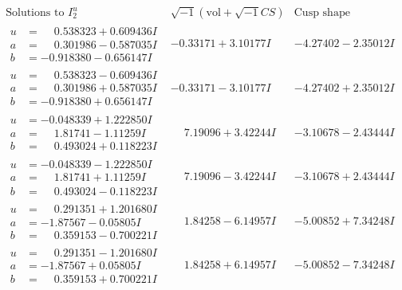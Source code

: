 \documentclass[1p]{elsarticle_modified}
\theoremstyle{definition}
\newcommand{\I}{\sqrt{-1}}
\begin{document}
$$\begin{array}{c|c|c}  
\text{Solutions to }I^u_{2}& \I (\text{vol} + \sqrt{-1}CS) & \text{Cusp shape}\\
 \hline 
\begin{aligned}
u &= \phantom{-}0.538323 + 0.609436 I \\
a &= \phantom{-}0.301986 - 0.587035 I \\
b &= -0.918380 - 0.656147 I\end{aligned}
 & -0.33171 + 3.10177 I & -4.27402 - 2.35012 I \\ \hline\begin{aligned}
u &= \phantom{-}0.538323 - 0.609436 I \\
a &= \phantom{-}0.301986 + 0.587035 I \\
b &= -0.918380 + 0.656147 I\end{aligned}
 & -0.33171 - 3.10177 I & -4.27402 + 2.35012 I \\ \hline\begin{aligned}
u &= -0.048339 + 1.222850 I \\
a &= \phantom{-}1.81741 - 1.11259 I \\
b &= \phantom{-}0.493024 + 0.118223 I\end{aligned}
 & \phantom{-}7.19096 + 3.42244 I & -3.10678 - 2.43444 I \\ \hline\begin{aligned}
u &= -0.048339 - 1.222850 I \\
a &= \phantom{-}1.81741 + 1.11259 I \\
b &= \phantom{-}0.493024 - 0.118223 I\end{aligned}
 & \phantom{-}7.19096 - 3.42244 I & -3.10678 + 2.43444 I \\ \hline\begin{aligned}
u &= \phantom{-}0.291351 + 1.201680 I \\
a &= -1.87567 - 0.05805 I \\
b &= \phantom{-}0.359153 - 0.700221 I\end{aligned}
 & \phantom{-}1.84258 - 6.14957 I & -5.00852 + 7.34248 I \\ \hline\begin{aligned}
u &= \phantom{-}0.291351 - 1.201680 I \\
a &= -1.87567 + 0.05805 I \\
b &= \phantom{-}0.359153 + 0.700221 I\end{aligned}
 & \phantom{-}1.84258 + 6.14957 I & -5.00852 - 7.34248 I \\ \hline\begin{aligned}

\end{aligned}
\end{array}$$
\end{document}
